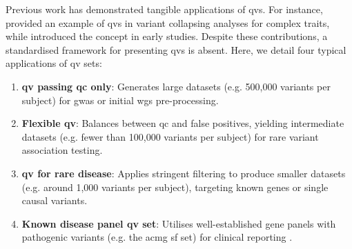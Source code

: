 %

Previous work has demonstrated tangible applications of \ac{qv}s. For instance, \citet{povysil2019rare} provided an example of \ac{qv}s in variant collapsing analyses for complex traits, while \citet{cirulli2015exome} introduced the concept in early studies. Despite these contributions, a standardised framework for presenting \ac{qv}s is absent. Here, we detail four typical applications of \ac{qv} sets:
\begin{enumerate}
    \item \textbf{\ac{qv} passing \ac{qc} only}: Generates large datasets (e.g. 500,000 variants per subject) for \ac{gwas} or initial \ac{wgs} pre-processing.
    \item \textbf{Flexible \ac{qv}}: Balances between \ac{qc} and false positives, yielding intermediate datasets (e.g. fewer than 100,000 variants per subject) for rare variant association testing.
    \item \textbf{\ac{qv} for rare disease}: Applies stringent filtering to produce smaller datasets (e.g. around 1,000 variants per subject), targeting known genes or single causal variants.
    \item \textbf{Known disease panel \ac{qv} set}: Utilises well-established gene panels with pathogenic variants (e.g. the \ac{acmg} \ac{sf} set) for clinical reporting \cite{miller2023acmg}.
\end{enumerate}

